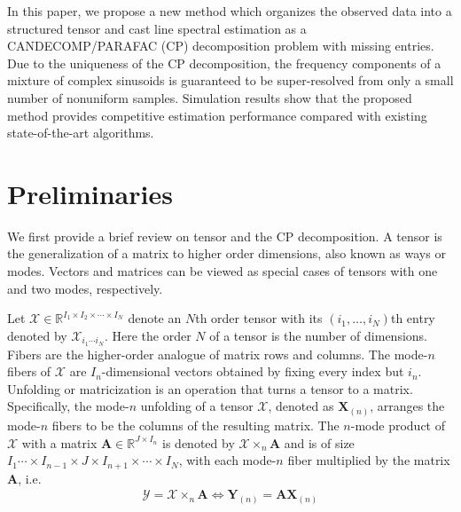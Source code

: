 \documentclass[10pt,journal,epsfig]{IEEEtran}
\begin{document}
In this paper, we propose a new method which organizes the
observed data into a structured tensor and cast line spectral
estimation as a CANDECOMP/PARAFAC (CP) decomposition problem with
missing entries. Due to the uniqueness of the CP decomposition,
the frequency components of a mixture of complex sinusoids is
guaranteed to be super-resolved from only a small number of
nonuniform samples. Simulation results show that the proposed
method provides competitive estimation performance compared with
existing state-of-the-art algorithms.




\section{Preliminaries}
We first provide a brief review on tensor and the CP
decomposition. A tensor is the generalization of a matrix to
higher order dimensions, also known as ways or modes. Vectors and
matrices can be viewed as special cases of tensors with one and
two modes, respectively.

Let $\boldsymbol{\mathcal{X}}\in\mathbb{R}^{I_1\times
I_2\times\cdots\times I_N}$ denote an $N$th order tensor with its
$(i_1,\ldots,i_N)$th entry denoted by $\mathcal{X}_{i_1\cdots
i_N}$. Here the order $N$ of a tensor is the number of dimensions.
Fibers are the higher-order analogue of matrix rows and columns.
The mode-$n$ fibers of $\boldsymbol{\mathcal{X}}$ are
$I_n$-dimensional vectors obtained by fixing every index but
$i_n$. Unfolding or matricization is an operation that turns a
tensor to a matrix. Specifically, the mode-$n$ unfolding of a
tensor $\boldsymbol{\mathcal{X}}$, denoted as
$\boldsymbol{X}_{(n)}$, arranges the mode-$n$ fibers to be the
columns of the resulting matrix. The $n$-mode product of
$\boldsymbol{\mathcal{X}}$ with a matrix
$\boldsymbol{A}\in\mathbb{R}^{J\times I_n}$ is denoted by
$\boldsymbol{\mathcal{X}}\times_n\boldsymbol{A}$ and is of size
$I_1\cdots\times I_{n-1}\times J\times I_{n+1}\times\cdots\times
I_N$, with each mode-$n$ fiber multiplied by the matrix
$\boldsymbol{A}$, i.e.
\begin{align}
\boldsymbol{\mathcal{Y}}=\boldsymbol{\mathcal{X}}\times_n\boldsymbol{A}\Leftrightarrow
\boldsymbol{Y}_{(n)}=\boldsymbol{A}\boldsymbol{X}_{(n)}
\end{align}
\end{document}
